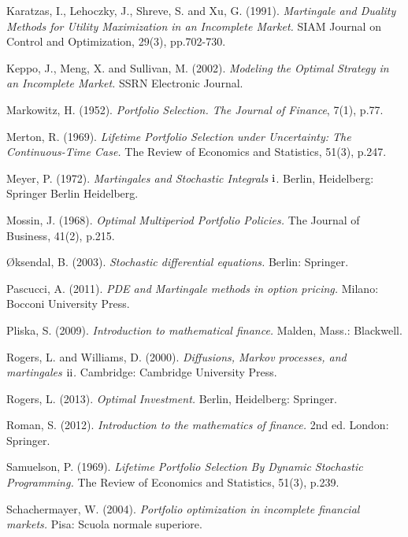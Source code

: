 \documentclass[a4paper]{article}
\theoremstyle{definition}
\numberwithin{equation}{section}
\begin{document}
\begin{thebibliography}{9}
 Karatzas, I., Lehoczky, J., Shreve, S. and Xu, G. (1991). \textit{Martingale and Duality Methods for Utility Maximization in an Incomplete Market.} SIAM Journal on Control and Optimization, 29(3), pp.702-730.

 Keppo, J., Meng, X. and Sullivan, M. (2002). \textit{Modeling the Optimal Strategy in an Incomplete Market.} SSRN Electronic Journal.

 Markowitz, H. (1952). \textit{Portfolio Selection. The Journal of Finance}, 7(1), p.77.

 Merton, R. (1969). \emph{Lifetime Portfolio Selection under Uncertainty: The Continuous-Time Case.} The Review of Economics and Statistics, 51(3), p.247.

 Meyer, P. (1972). \textit{Martingales and Stochastic Integrals $\text{\uppercase\expandafter{\romannumeral1}}$}. Berlin, Heidelberg: Springer Berlin Heidelberg.

 Mossin, J. (1968). \textit{Optimal Multiperiod Portfolio Policies.} The Journal of Business, 41(2), p.215.

Øksendal, B. (2003). \textit{Stochastic differential equations.} Berlin: Springer.

 Pascucci, A. (2011). \textit{PDE and Martingale methods in option pricing.} Milano: Bocconi University Press.

 Pliska, S. (2009). \textit{Introduction to mathematical finance.} Malden, Mass.: Blackwell.

 Rogers, L. and Williams, D. (2000). \textit{Diffusions, Markov processes, and martingales $\text{\uppercase\expandafter{\romannumeral2}}$.} Cambridge: Cambridge University Press.

 Rogers, L. (2013). \emph{Optimal Investment.} Berlin, Heidelberg: Springer.

 Roman, S. (2012). \emph{Introduction to the mathematics of finance.} 2nd ed. London: Springer.

 Samuelson, P. (1969). \textit{Lifetime Portfolio Selection By Dynamic Stochastic Programming.} The Review of Economics and Statistics, 51(3), p.239.

 Schachermayer, W. (2004). \emph{Portfolio optimization in incomplete financial markets.} Pisa: Scuola normale superiore.


\end{thebibliography}
\end{document}
